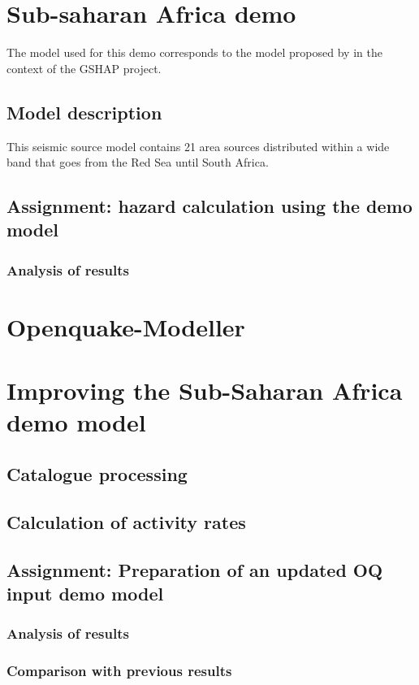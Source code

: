 \documentclass[11pt,a4paper,headings=small,dvips]{scrbook}
\begin{document}
\chapter{Sub-saharan Africa demo}
The model used for this demo corresponds to the model proposed by 
\citet{midzi1999} in the context of the GSHAP project.
\section{Model description}
This seismic source model contains 21 area sources distributed within a wide 
band that goes from the Red Sea until South Africa.
\section{Assignment: hazard calculation using the demo model}
\subsection{Analysis of results}
\cleardoublepage
\chapter{Openquake-Modeller}
  
\cleardoublepage
\chapter{Improving the Sub-Saharan Africa demo model}
\section{Catalogue processing}
\section{Calculation of activity rates}
\section{Assignment: Preparation of an updated OQ input demo model}
\subsection{Analysis of results}
\subsection{Comparison with previous results}
\cleardoublepage


\cleardoublepage
\end{document}
